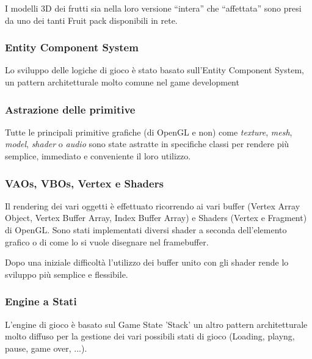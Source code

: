 I modelli 3D dei frutti sia nella loro versione \enquote{intera} che \enquote{affettata} sono presi da uno dei tanti Fruit pack disponibili in rete.


\subsubsection{Entity Component System}
Lo sviluppo delle logiche di gioco è stato basato sull'Entity Component System, un pattern architetturale molto comune nel game development


\subsubsection{Astrazione delle primitive}
Tutte le principali primitive grafiche (di OpenGL e non) come \textit{texture}, \textit{mesh}, \textit{model}, \textit{shader} o \textit{audio} sono state astratte in specifiche classi per rendere più semplice, immediato e conveniente il loro utilizzo.


\subsubsection{VAOs, VBOs, Vertex e Shaders}
Il rendering dei vari oggetti è effettuato ricorrendo ai vari buffer (Vertex Array Object, Vertex Buffer Array, Index Buffer Array) e Shaders (Vertex e Fragment) di OpenGL. Sono stati implementati diversi shader a seconda dell'elemento grafico o di come lo si vuole disegnare nel framebuffer.

Dopo una iniziale difficoltà l'utilizzo dei buffer unito con gli shader rende lo sviluppo più semplice e flessibile.


\subsubsection{Engine a Stati}
L'engine di gioco è basato sul Game State 'Stack' un altro pattern architetturale molto diffuso per la gestione dei vari possibili stati di gioco (Loading, playng, pause, game over, ...).



